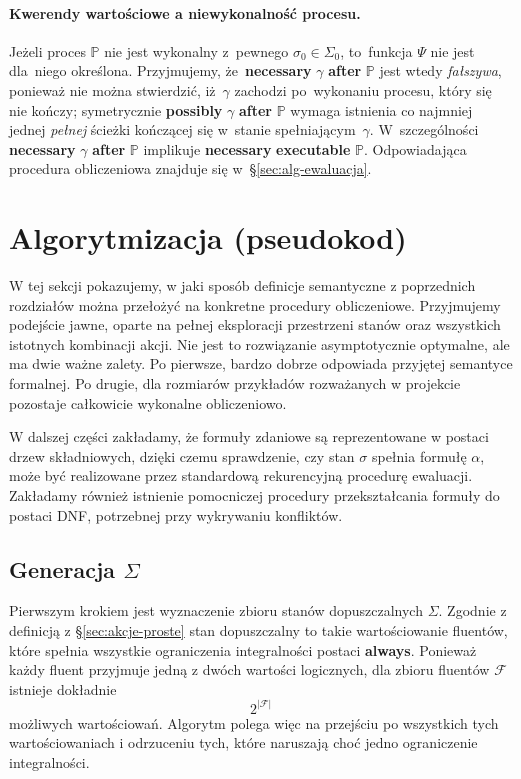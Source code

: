 \documentclass[11pt,a4paper]{article}
\newcommand{\aft}{\textbf{after}}
\newcommand{\necessary}{\textbf{necessary}}
\newcommand{\possibly}{\textbf{possibly}}
\newcommand{\executable}{\textbf{executable}}
\theoremstyle{definition}
\begin{document}
\paragraph{Kwerendy wartościowe a niewykonalność procesu.}
Jeżeli proces $\mathbb{P}$ nie jest wykonalny z~pewnego $\sigma_0 \in \Sigma_0$, to~funkcja $\Psi$ nie jest dla~niego określona. Przyjmujemy, że~\necessary{} $\gamma$ \aft{} $\mathbb{P}$ jest wtedy \emph{fałszywa}, ponieważ nie można stwierdzić, iż~$\gamma$ zachodzi po~wykonaniu procesu, który się nie kończy; symetrycznie \possibly{} $\gamma$ \aft{} $\mathbb{P}$ wymaga istnienia co najmniej jednej \emph{pełnej} ścieżki kończącej się w~stanie spełniającym~$\gamma$. W~szczególności \necessary{} $\gamma$ \aft{} $\mathbb{P}$ implikuje \necessary{} \executable{} $\mathbb{P}$. Odpowiadająca procedura obliczeniowa znajduje się w~\S\ref{sec:alg-ewaluacja}.

\section{Algorytmizacja (pseudokod)}

W tej sekcji pokazujemy, w jaki sposób definicje semantyczne z poprzednich rozdziałów można przełożyć na konkretne procedury obliczeniowe. Przyjmujemy podejście jawne, oparte na pełnej eksploracji przestrzeni stanów oraz wszystkich istotnych kombinacji akcji. Nie jest to rozwiązanie asymptotycznie optymalne, ale ma dwie ważne zalety. Po pierwsze, bardzo dobrze odpowiada przyjętej semantyce formalnej. Po drugie, dla rozmiarów przykładów rozważanych w projekcie pozostaje całkowicie wykonalne obliczeniowo.

W dalszej części zakładamy, że formuły zdaniowe są reprezentowane w postaci drzew składniowych, dzięki czemu sprawdzenie, czy stan $\sigma$ spełnia formułę $\alpha$, może być realizowane przez standardową rekurencyjną procedurę ewaluacji. Zakładamy również istnienie pomocniczej procedury przekształcania formuły do postaci DNF, potrzebnej przy wykrywaniu konfliktów.

\subsection{Generacja \texorpdfstring{$\Sigma$}{Sigma}}

Pierwszym krokiem jest wyznaczenie zbioru stanów dopuszczalnych $\Sigma$. Zgodnie z definicją z §\ref{sec:akcje-proste} stan dopuszczalny to takie wartościowanie fluentów, które spełnia wszystkie ograniczenia integralności postaci \textbf{always}. Ponieważ każdy fluent przyjmuje jedną z dwóch wartości logicznych, dla zbioru fluentów $\mathcal{F}$ istnieje dokładnie
\[
2^{|\mathcal{F}|}
\]
możliwych wartościowań. Algorytm polega więc na przejściu po wszystkich tych wartościowaniach i odrzuceniu tych, które naruszają choć jedno ograniczenie integralności.
\end{document}
